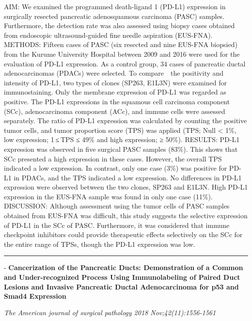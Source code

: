 \documentclass[]{article}
\begin{document}
AIM: We examined the programmed death-ligand 1 (PD-L1) expression in
surgically resected pancreatic adenosquamous carcinoma (PASC) samples.
Furthermore, the detection rate was also assessed using biopsy cases
obtained from endoscopic ultrasound-guided fine needle aspiration
(EUS-FNA). METHODS: Fifteen cases of PASC (six resected and nine EUS-FNA
biopsied) from the Kurume University Hospital between 2009 and 2016 were
used for the evaluation of PD-L1 expression. As a control group, 34
cases of pancreatic ductal adenocarcinomas (PDACs) were selected. To
compare　the positivity and intensity of PD-L1, two types of clones
(SP263, E1L3N) were examined for immunostaining. Only the membrane
expression of PD-L1 was regarded as positive. The PD-L1 expressions in
the squamous cell carcinoma component (SCc), adenocarcinoma component
(ACc), and immune cells were assessed separately. The ratio of PD-L1
expression was calculated by counting the positive tumor cells, and
tumor proportion score (TPS) was applied (TPS; Null \textless{} 1\%, low
expression; 1 ≤ TPS ≤ 49\% and high expression; ≥ 50\%). RESULTS: PD-L1
expression was observed in five surgical PASC samples (83\%). This shows
that SCc presented a high expression in these cases. However, the
overall TPS indicated a low expression. In contrast, only one case (3\%)
was positive for PD-L1 in PDACs, and the TPS indicated a low expression.
No differences in PD-L1 expression were observed between the two clones,
SP263 and E1L3N. High PD-L1 expression in the EUS-FNA sample was found
in only one case (11\%). DISCUSSION: Although assessment using the tumor
cells of PASC samples obtained from EUS-FNA was difficult, this study
suggests the selective expression of PD-L1 in the SCc of PASC.
Furthermore, it was considered that immune checkpoint inhibitors could
provide therapeutic effects selectively on the SCc for the entire range
of TPSs, though the PD-L1 expression was low.

{}

{}

\begin{center}\rule{0.5\linewidth}{\linethickness}\end{center}

 - \textbf{Cancerization of the Pancreatic Ducts: Demonstration of a
Common and Under-recognized Process Using Immunolabeling of Paired Duct
Lesions and Invasive Pancreatic Ductal Adenocarcinoma for p53 and Smad4
Expression}

\emph{The American journal of surgical pathology 2018
Nov;42(11):1556-1561}
\end{document}
